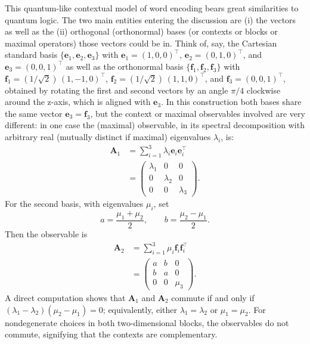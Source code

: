 \documentclass[%
  reprint,
  superscriptaddress,
  showpacs,
  showkeys,
  amsmath,amssymb,
  pra,
  longbibliography,
  floatfix,
  x11names
]{revtex4-2}
\begin{document}
This quantum-like contextual model of word encoding
bears great similarities to quantum logic.
The two main entities entering the discussion are
(i) the vectors as well as the
(ii) orthogonal (orthonormal) bases (or contexts or blocks or maximal operators) those vectors could be in.
Think of, say, the Cartesian standard basis $\{\bm{e}_1, \bm{e}_2, \bm{e}_3\}$ with
$\bm{e}_1= (1,0,0)^\intercal$, $\bm{e}_2=(0,1,0)^\intercal$, and $\bm{e}_3=(0,0,1)^\intercal$ as well as the orthonormal basis $\{\bm{f}_1, \bm{f}_2, \bm{f}_3\}$
with $\bm{f}_1=(1/\sqrt{2})\, (1 , -1  , 0)^\intercal$, $\bm{f}_2=(1/\sqrt{2})\,  (1 , 1 , 0)^\intercal$, and $\bm{f}_3=(0,0,1)^\intercal$, obtained by rotating the first and second vectors
by an angle $\pi/4$ clockwise around the z-axis, which is aligned with $\bm{e}_3$.
In this construction both bases share the same vector $\bm{e}_3 = \bm{f}_3$, but the context or maximal observables involved are very different:
in one case the (maximal) observable, in its spectral decomposition with arbitrary real (mutually distinct if maximal) eigenvalues $\lambda_i$, is:
\begin{align}
\bm{A}_1 &= \sum_{i=1}^3 \lambda_i \bm{e}_i \bm{e}_i^\intercal \\
&=
\begin{pmatrix}
\lambda_1 & 0 & 0 \\
0 & \lambda_2 & 0 \\
0 & 0 & \lambda_3
\end{pmatrix}.
\end{align}
For the second basis, with eigenvalues $\mu_i$, set
\begin{equation}
 a=\frac{\mu_1+\mu_2}{2},\qquad b=\frac{\mu_2-\mu_1}{2}.
\end{equation}
Then the observable is
\begin{align}
\bm{A}_2 &= \sum_{i=1}^3 \mu_i \bm{f}_i \bm{f}_i^\intercal \\
&=
\begin{pmatrix}
a & b & 0 \\
b & a & 0 \\
0 & 0 & \mu_3
\end{pmatrix}.
\end{align}
A direct computation shows that $\bm{A}_1$ and $\bm{A}_2$ commute if and only if
$(\lambda_1-\lambda_2)(\mu_2-\mu_1)=0$; equivalently, either $\lambda_1=\lambda_2$ or $\mu_1=\mu_2$.
For nondegenerate choices in both two-dimensional blocks, the observables do not commute, signifying that the contexts are complementary.
\end{document}
